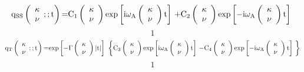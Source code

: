 \documentclass{article}
\begin{document}
\[{{\rm q}}_{{\rm SS}}\left( \begin{array}{c}
{\mathbf \kappa } \\ 
\nu  \end{array}
;;{\rm t}\right){\rm =}{{\rm C}}_{{\rm 1}}\left( \begin{array}{c}
{\mathbf \kappa } \\ 
\nu  \end{array}
\right){\exp  \left[{\rm i}{\omega }_{{\rm A}}\left( \begin{array}{c}
{\mathbf \kappa } \\ 
\nu  \end{array}
\right){\rm t}\right]\ }{\rm +}{{\rm C}}_{{\rm 2}}\left( \begin{array}{c}
{\mathbf \kappa } \\ 
\nu  \end{array}
\right){\exp  \left[{\rm -}{\rm i}{\omega }_{{\rm A}}\left( \begin{array}{c}
{\mathbf \kappa } \\ 
\nu  \end{array}
\right){\rm t}\right]\ }\] 
\[1\] 
\[{{\rm q}}_{{\rm T}}\left( \begin{array}{c}
{\mathbf \kappa } \\ 
\nu  \end{array}
;;{\rm t}\right){\rm =}{\exp  \left[{\rm -}\Gamma \left( \begin{array}{c}
{\mathbf \kappa } \\ 
\nu  \end{array}
\right)\left|{\rm t}\right|\right]\ }\left\{{{\rm C}}_{{\rm 3}}\left( \begin{array}{c}
{\mathbf \kappa } \\ 
\nu  \end{array}
\right){\exp  \left[{\rm i}{\omega }_{{\rm A}}\left( \begin{array}{c}
{\mathbf \kappa } \\ 
\nu  \end{array}
\right){\rm t}\right]\ }{\rm -}{{\rm C}}_{{\rm 4}}\left( \begin{array}{c}
{\mathbf \kappa } \\ 
\nu  \end{array}
\right){\exp  \left[{\rm -}{\rm i}{\omega }_{{\rm A}}\left( \begin{array}{c}
{\mathbf \kappa } \\ 
\nu  \end{array}
\right){\rm t}\right]\ }\right\}\] 
\[1\] 
\end{document}
